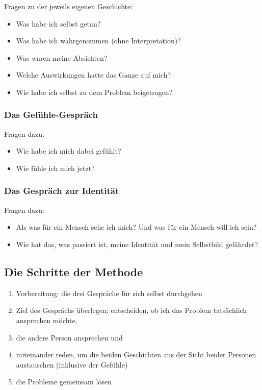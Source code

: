 Fragen zu der jeweils eigenen Geschichte:

\begin{itemize}
    \item Was habe ich selbst getan?
    \item Was habe ich wahrgenommen (ohne Interpretation)?
    \item Was waren meine Absichten?
    \item Welche Auswirkungen hatte das Ganze auf mich?
    \item Wie habe ich selbst zu dem Problem beigetragen?
\end{itemize}

\subsubsection{Das Gefühle-Gespräch}

Fragen dazu:

\begin{itemize}
    \item Wie habe ich mich dabei gefühlt?
    \item Wie fühle ich mich jetzt?
\end{itemize}

\subsubsection{Das Gespräch zur Identität}

Fragen dazu:

\begin{itemize}
    \item Als was für ein Mensch sehe ich mich? Und was für ein Mensch will ich sein?
    \item Wie hat das, was passiert ist, meine Identität und mein Selbstbild gefährdet?
\end{itemize}

\subsection{Die Schritte der Methode}

\begin{enumerate}
    \item Vorbereitung: die drei Gespräche für sich selbst durchgehen
    \item Ziel des Gesprächs überlegen: entscheiden, ob ich das Problem tatsächlich ansprechen möchte.
    \item die andere Person ansprechen und 
    \item miteinander reden, um die beiden Geschichten aus der Sicht beider Personen austauschen (inklusive der Gefühle)
    \item die Probleme gemeinsam lösen
\end{enumerate}

